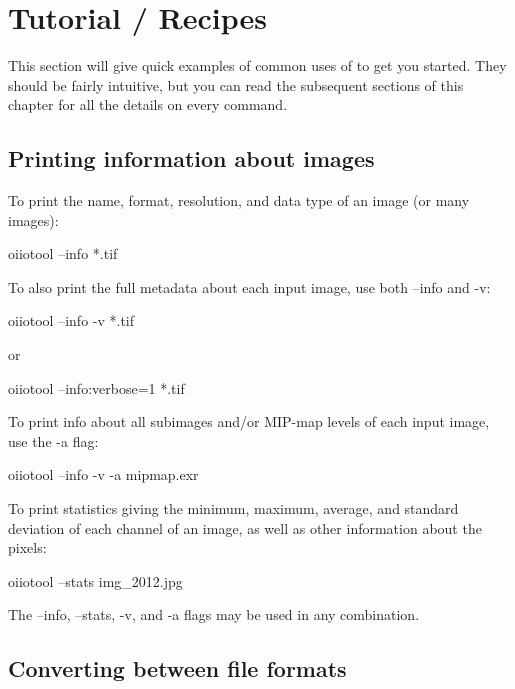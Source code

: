 \section{\oiiotool Tutorial / Recipes}

This section will give quick examples of common uses of \oiiotool to get
you started.  They should be fairly intuitive, but you can read the
subsequent sections of this chapter for all the details on every
command.

\subsection*{Printing information about images}

To print the name, format, resolution, and data type of an image
(or many images):

\begin{code}
    oiiotool --info *.tif
\end{code}

\noindent To also print the full metadata about each input image, use both
{\cf --info} and {\cf -v}:

\begin{code}
    oiiotool --info -v *.tif
\end{code}

\noindent or

\begin{code}
    oiiotool --info:verbose=1 *.tif
\end{code}

\noindent To print info about all subimages and/or MIP-map levels of each
input image, use the {\cf -a} flag:

\begin{code}
    oiiotool --info -v -a mipmap.exr
\end{code}

\noindent To print statistics giving the minimum, maximum, average, and
standard deviation of each channel of an image, as well as other
information about the pixels:

\begin{code}
    oiiotool --stats img_2012.jpg
\end{code}

\noindent The {\cf --info}, {\cf --stats}, {\cf -v}, and {\cf -a} flags may
be used in any combination.


\subsection*{Converting between file formats}

